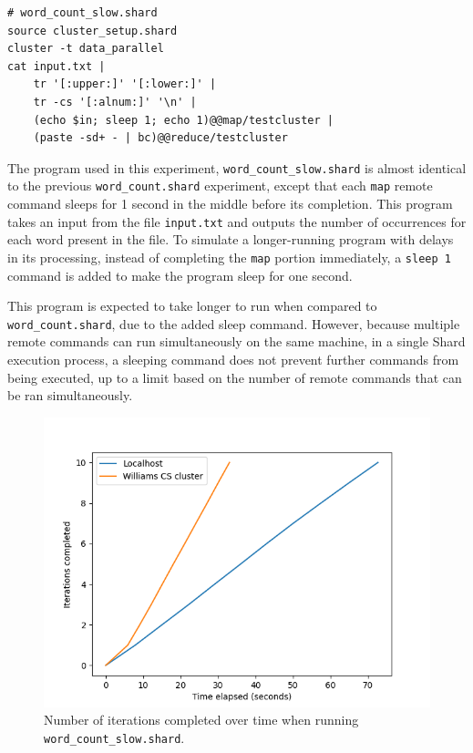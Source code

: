 \documentclass[oneside]{report}
\begin{document}
\begin{minipage}[c]{\textwidth-15pt}
  \begin{lstlisting}[language=Shard]
# word_count_slow.shard
source cluster_setup.shard
cluster -t data_parallel
cat input.txt |
    tr '[:upper:]' '[:lower:]' |
    tr -cs '[:alnum:]' '\n' |
    (echo $in; sleep 1; echo 1)@@map/testcluster |
    (paste -sd+ - | bc)@@reduce/testcluster
\end{lstlisting}
  \smallskip
\end{minipage}

The program used in this experiment, \texttt{word\_count\_slow.shard} is almost identical to the previous \texttt{word\_count.shard} experiment, except that each \texttt{map} remote command sleeps for 1 second in the middle before its completion.
This program takes an input from the file \texttt{input.txt} and outputs the number of occurrences for each word present in the file.
To simulate a longer-running program with delays in its processing, instead of completing the \texttt{map} portion immediately, a \texttt{sleep 1} command is added to make the program sleep for one second.

This program is expected to take longer to run when compared to \texttt{word\_count.shard}, due to the added sleep command.
However, because multiple remote commands can run simultaneously on the same machine, in a single Shard execution process, a sleeping command does not prevent further commands from being executed, up to a limit based on the number of remote commands that can be ran simultaneously.

\begin{figure}[h]
  \begin{center}
    \includegraphics[scale=0.9]{img/experiments/e3_1620960581241.png}
    \caption{Number of iterations completed over time when running \texttt{word\_count\_slow.shard}.}
    \label{fig:wordcountslow}
  \end{center}
\end{figure}
\end{document}
